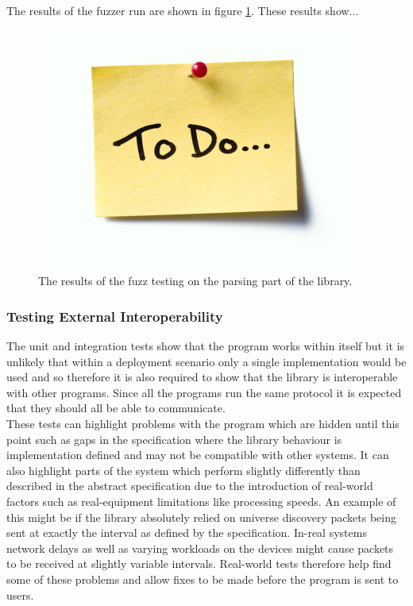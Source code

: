 \documentclass[11pt,a4paper]{report}
\begin{document}
The results of the fuzzer run are shown in figure \ref{FUZZ_RESULTS}. These results show...

\begin{figure}[H]
	\label{FUZZ_RESULTS}
	\includegraphics[width=\textwidth]{todo}
	\caption{The results of the fuzz testing on the parsing part of the library.}
\end{figure}

\subsubsection{Testing External Interoperability}
The unit and integration tests show that the program works within itself but it is unlikely that within a deployment scenario only a single implementation would be used and so therefore it is also required to show that the library is interoperable with other programs. Since all the programs run the same protocol it is expected that they should all be able to communicate. \\

These tests can highlight problems with the program which are hidden until this point such as gaps in the specification where the library behaviour is implementation defined and may not be compatible with other systems. It can also highlight parts of the system which perform slightly differently than described in the abstract specification due to the introduction of real-world factors such as real-equipment limitations like processing speeds. An example of this might be if the library absolutely relied on universe discovery packets being sent at exactly the interval as defined by the specification. In-real systems network delays as well as varying workloads on the devices might cause packets to be received at slightly variable intervals. Real-world tests therefore help find some of these problems and allow fixes to be made before the program is sent to users.
\end{document}
